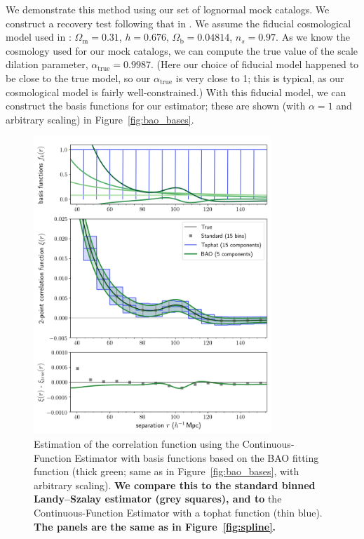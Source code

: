 \documentclass[modern]{aastex62}
\newcommand{\est}{the Continuous-Function Estimator\xspace}
\newcommand{\new}[1]{\textbf{#1}}
\begin{document}
We demonstrate this method using our set of lognormal mock catalogs.
We construct a recovery test following that in \cite{Hinton2019}.
We assume the fiducial cosmological model used in \cite{Beutler2017}: $\Omega_{\text{m}} = 0.31$, $h = 0.676$, $\Omega_{\text{b}} = 0.04814$, $n_s = 0.97$. 
As we know the cosmology used for our mock catalogs, we can compute the true value of the scale dilation parameter, $\alpha_{\text{true}}=0.9987$.
(Here our choice of fiducial model happened to be close to the true model, so our $\alpha_{\text{true}}$ is very close to 1; this is typical, as our cosmological model is fairly well-constrained.)
With this fiducial model, we can construct the basis functions for our estimator; these are shown (with $\alpha=1$ and arbitrary scaling) in Figure~\ref{fig:bao_bases}.

\label{fig:bao}
\begin{figure}[t]
\centering
    \includegraphics[width=0.8\textwidth]{xicomparison_2e-4_tophat8_baoiter}
    \caption{Estimation of the correlation function using \est with basis functions based on the BAO fitting function (thick green; same as in Figure~\ref{fig:bao_bases}, with arbitrary scaling). \new{We compare this to the standard binned Landy--Szalay estimator (grey squares), and to} \est with a tophat function (thin blue). \new{The panels are the same as in Figure~\ref{fig:spline}.}}
\end{figure}
\end{document}
